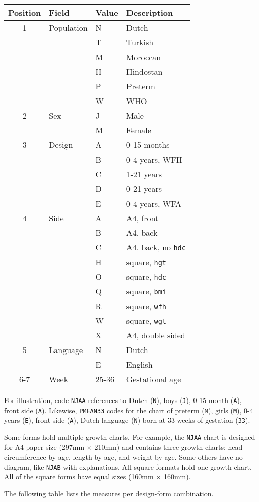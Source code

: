\documentclass[]{book}
\begin{document}
\begin{longtable}[]{@{}clll@{}}
\toprule
Position & Field & Value & Description\tabularnewline
\midrule
\endhead
1 & Population & N & Dutch\tabularnewline
& & T & Turkish\tabularnewline
& & M & Moroccan\tabularnewline
& & H & Hindostan\tabularnewline
& & P & Preterm\tabularnewline
& & W & WHO\tabularnewline
2 & Sex & J & Male\tabularnewline
& & M & Female\tabularnewline
3 & Design & A & 0-15 months\tabularnewline
& & B & 0-4 years, WFH\tabularnewline
& & C & 1-21 years\tabularnewline
& & D & 0-21 years\tabularnewline
& & E & 0-4 years, WFA\tabularnewline
4 & Side & A & A4, front\tabularnewline
& & B & A4, back\tabularnewline
& & C & A4, back, no \texttt{hdc}\tabularnewline
& & H & square, \texttt{hgt}\tabularnewline
& & O & square, \texttt{hdc}\tabularnewline
& & Q & square, \texttt{bmi}\tabularnewline
& & R & square, \texttt{wfh}\tabularnewline
& & W & square, \texttt{wgt}\tabularnewline
& & X & A4, double sided\tabularnewline
5 & Language & N & Dutch\tabularnewline
& & E & English\tabularnewline
6-7 & Week & 25-36 & Gestational age\tabularnewline
\bottomrule
\end{longtable}

For illustration, code \texttt{NJAA} references to Dutch (\texttt{N}), boys (\texttt{J}), 0-15 month (\texttt{A}), front side (\texttt{A}). Likewise, \texttt{PMEAN33} codes for the chart of preterm (\texttt{M}), girls (\texttt{M}), 0-4 years (\texttt{E}), front side (\texttt{A}), Dutch language (\texttt{N}) born at 33 weeks of gestation (\texttt{33}).

Some forms hold multiple growth charts. For example, the \texttt{NJAA} chart is designed for A4 paper size (297mm \(\times\) 210mm) and contains three growth charts: head circumference by age, length by age, and weight by age. Some others have no diagram, like \texttt{NJAB} with explanations. All square formats hold one growth chart. All of the square forms have equal sizes (160mm \(\times\) 160mm).

The following table lists the measures per design-form combination.
\end{document}
